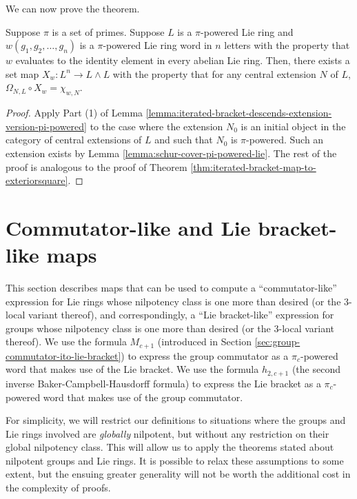 \documentclass{ucetd}
\begin{document}
We can now prove the theorem.

\begin{theorem}\label{thm:iterated-bracket-map-to-exteriorsquare-pi-powered}
  Suppose $\pi$ is a set of primes. Suppose $L$ is a $\pi$-powered Lie
  ring and $w(g_1,g_2,\dots,g_n)$ is a $\pi$-powered Lie ring word in
  $n$ letters with the property that $w$ evaluates to the identity
  element in every abelian Lie ring. Then, there exists a set map
  $X_w:L^n \to L \wedge L$ with the property that for any central
  extension $N$ of $L$, $\Omega_{N,L} \circ X_w = \chi_{w,N}$.
\end{theorem}

\begin{proof}
  Apply Part (1) of Lemma
  \ref{lemma:iterated-bracket-descends-extension-version-pi-powered} to
  the case where the extension $N_0$ is an initial object in the
  category of central extensions of $L$ and such that $N_0$ is
  $\pi$-powered. Such an extension exists by Lemma
  \ref{lemma:schur-cover-pi-powered-lie}. The rest of the proof is
  analogous to the proof of Theorem \ref{thm:iterated-bracket-map-to-exteriorsquare}.
\end{proof}


\section{Commutator-like and Lie bracket-like maps}\label{sec:commutator-and-lie-bracket-like-maps}

This section describes maps that can be used to compute a
``commutator-like'' expression for Lie rings whose nilpotency class is
one more than desired (or the $3$-local variant thereof), and
correspondingly, a ``Lie bracket-like'' expression for groups whose
nilpotency class is one more than desired (or the $3$-local variant
thereof). We use the formula $M_{c+1}$ (introduced in Section
\ref{sec:group-commutator-ito-lie-bracket}) to express the group
commutator as a $\pi_c$-powered word that makes use of the Lie
bracket. We use the formula $h_{2,c+1}$ (the second inverse
Baker-Campbell-Hausdorff formula) to express the Lie bracket as a
$\pi_c$-powered word that makes use of the group commutator.

For simplicity, we will restrict our definitions to situations where
the groups and Lie rings involved are {\em globally} nilpotent, but
without any restriction on their global nilpotency class. This will
allow us to apply the theorems stated about nilpotent groups and Lie
rings. It is possible to relax these assumptions to some extent, but
the ensuing greater generality will not be worth the additional cost
in the complexity of proofs.
\end{document}
